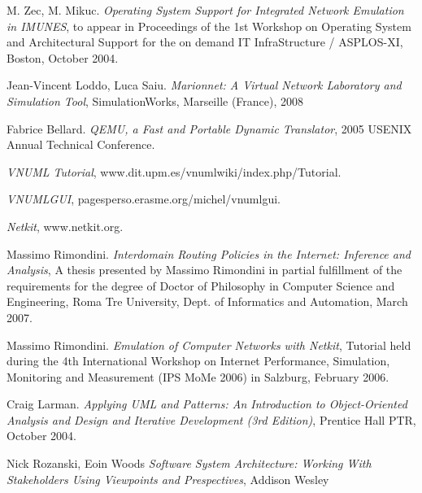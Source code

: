 \clearpage
\begin{thebibliography}{9}
	M. Zec, M. Mikuc.
	\emph{Operating System Support for Integrated Network Emulation in IMUNES}, to appear in Proceedings of the 1st Workshop on Operating System and Architectural Support for the on demand IT InfraStructure / ASPLOS-XI, Boston, October 2004.

	Jean-Vincent Loddo, Luca Saiu.
	\emph{Marionnet: A Virtual Network Laboratory and Simulation Tool}, SimulationWorks, Marseille (France), 2008

	Fabrice Bellard.
	\emph{QEMU, a Fast and Portable Dynamic Translator}, 2005 USENIX Annual Technical Conference.

	\emph{VNUML Tutorial}, www.dit.upm.es/vnumlwiki/index.php/Tutorial.

	\emph{VNUMLGUI}, pagesperso.erasme.org/michel/vnumlgui.

	\emph{Netkit}, www.netkit.org.

	Massimo Rimondini.
	\emph{Interdomain Routing Policies in the Internet: Inference and Analysis}, A thesis presented by Massimo Rimondini in partial fulfillment of the requirements for the degree of Doctor of Philosophy in Computer Science and Engineering, Roma Tre University, Dept. of Informatics and Automation, March 2007.

	Massimo Rimondini.
	\emph{Emulation of Computer Networks with Netkit}, Tutorial held during the 4th International Workshop on Internet Performance, Simulation, Monitoring and Measurement (IPS MoMe 2006) in Salzburg, February 2006.

	Craig Larman.
	\emph{Applying UML and Patterns: An Introduction to Object-Oriented Analysis and Design and Iterative Development (3rd Edition)}, Prentice Hall PTR, October 2004.

	Nick Rozanski, Eoin Woods
	\emph{Software System Architecture: Working With Stakeholders Using Viewpoints and Prespectives}, Addison Wesley

\end{thebibliography}
